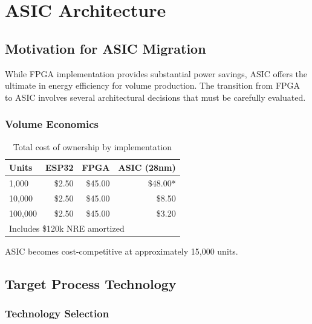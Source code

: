 
\chapter{ASIC Architecture} \label{chap:asic}

\section{Motivation for ASIC Migration}

While FPGA implementation provides substantial power savings, ASIC offers the ultimate in energy efficiency for volume production. The transition from FPGA to ASIC involves several architectural decisions that must be carefully evaluated.

\subsection{Volume Economics}

\begin{table}[h]
    \centering
    \caption{Total cost of ownership by implementation}
    \label{tab:tco}
    \begin{tabular}{lrrr}
        \toprule
        \textbf{Units} & \textbf{ESP32} & \textbf{FPGA} & \textbf{ASIC (28nm)} \\
        \midrule
        1,000 & \$2.50 & \$45.00 & \$48.00* \\
        10,000 & \$2.50 & \$45.00 & \$8.50 \\
        100,000 & \$2.50 & \$45.00 & \$3.20 \\
        \bottomrule
        \multicolumn{4}{l}{\small *Includes \$120k NRE amortized} \\
    \end{tabular}
\end{table}

ASIC becomes cost-competitive at approximately 15,000 units.

\section{Target Process Technology}

\subsection{Technology Selection}

